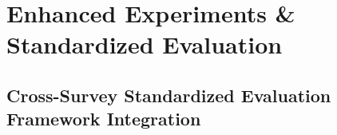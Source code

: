 \documentclass[journal]{IEEEtran}
\begin{document}
{%
%
%
%
%
%

\section{Enhanced Experiments \& Standardized Evaluation}
\label{sec:experiments}


\subsection{Cross-Survey Standardized Evaluation Framework Integration}

}
\end{document}
